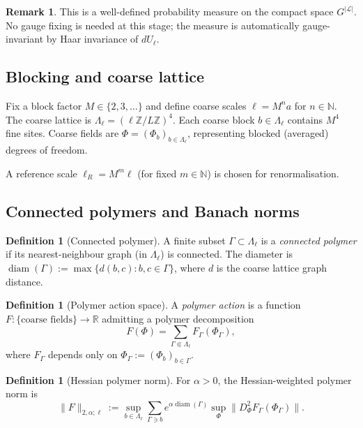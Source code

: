 \documentclass[12pt]{article}
\theoremstyle{plain}
\theoremstyle{definition}
\newtheorem{definition}[theorem]{Definition}
\newtheorem{remark}[theorem]{Remark}
\numberwithin{equation}{section}
\newcommand{\R}{\mathbb{R}}
\newcommand{\Z}{\mathbb{Z}}
\newcommand{\N}{\mathbb{N}}
\newcommand{\diam}{\operatorname{diam}}
\begin{document}
\begin{remark}
This is a well-defined probability measure on the compact space $G^{|\mathcal{L}|}$.  No gauge fixing is needed at this stage; the measure is automatically gauge-invariant by Haar invariance of $dU_\ell$.
\end{remark}

\subsection{Blocking and coarse lattice}

Fix a block factor $M\in\{2,3,\ldots\}$ and define coarse scales $\ell=M^n a$ for $n\in\N$.  The coarse lattice is $\Lambda_\ell=(\ell\Z/L\Z)^4$.  Each coarse block $b\in\Lambda_\ell$ contains $M^4$ fine sites.  Coarse fields are $\Phi=(\Phi_b)_{b\in\Lambda_\ell}$, representing blocked (averaged) degrees of freedom.

A reference scale $\ell_R=M^m\ell$ (for fixed $m\in\N$) is chosen for renormalisation.

\subsection{Connected polymers and Banach norms}

\begin{definition}[Connected polymer]
A finite subset $\Gamma\subset\Lambda_\ell$ is a \emph{connected polymer} if its nearest-neighbour graph (in $\Lambda_\ell$) is connected.  The diameter is $\diam(\Gamma):=\max\{d(b,c):b,c\in\Gamma\}$, where $d$ is the coarse lattice graph distance.
\end{definition}

\begin{definition}[Polymer action space]
A \emph{polymer action} is a function $F:\{\text{coarse fields}\}\to\R$ admitting a polymer decomposition
\begin{equation}
F(\Phi) = \sum_{\Gamma\Subset\Lambda_\ell}F_\Gamma(\Phi_\Gamma),
\end{equation}
where $F_\Gamma$ depends only on $\Phi_\Gamma:=(\Phi_b)_{b\in\Gamma}$.
\end{definition}

\begin{definition}[Hessian polymer norm]
For $\alpha>0$, the Hessian-weighted polymer norm is
\begin{equation}
\|F\|_{2,\alpha;\ell} := \sup_{b\in\Lambda_\ell}\sum_{\Gamma\ni b}e^{\alpha\diam(\Gamma)}\sup_\Phi\|D_\Phi^2 F_\Gamma(\Phi_\Gamma)\|.
\end{equation}
\end{definition}
\end{document}
